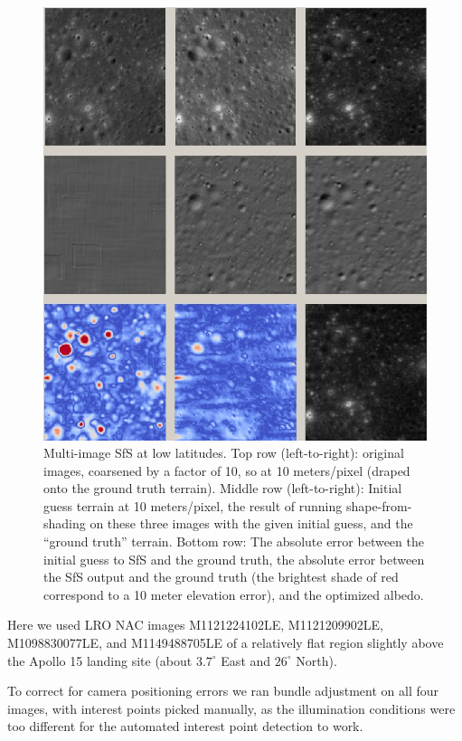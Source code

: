 \documentclass[12pt,oneside]{article}
\begin{document}
\begin{figure}[h!]
\includegraphics[width=6in]{figures/sfs2.jpg}
    \caption[Photoclinometry example]{
      \label{fig:sfs2} Multi-image SfS at low latitudes. Top row (left-to-right): original
      images, coarsened by a factor of 10, so at 10 meters/pixel (draped
      onto the ground truth terrain). Middle row (left-to-right):
      Initial guess terrain at 10 meters/pixel, the result of running
      shape-from-shading on these three images with the given initial
      guess, and the ``ground truth'' terrain. Bottom row: The absolute
      error between the initial guess to SfS and the ground truth, the absolute error
      between the SfS output and the ground truth (the brightest shade of
      red correspond to a 10 meter elevation error), and the optimized albedo.}
\end{figure}

Here we used LRO NAC images M1121224102LE, M1121209902LE, M1098830077LE, and M1149488705LE 
of a relatively flat region slightly above the Apollo 15
landing site (about $3.7^\circ$ East and $26^\circ$ North).

To correct for camera positioning errors we ran bundle adjustment on all
four images, with interest points picked manually, as the illumination
conditions were too different for the automated interest point
detection to work. 
\end{document}
